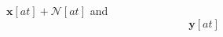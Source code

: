 \(\boldsymbol{x}[at] + \mathbf{\mathcal{N}}[at]\) and \begin{equation}\mathbf{y}[at]\end{equation}%
\RequirePackage{amsmath}
\endinput
